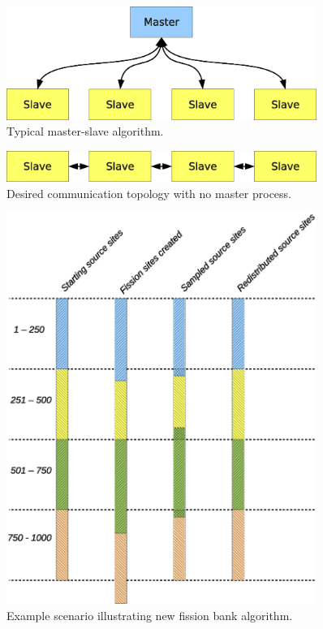 \documentclass[11pt]{article}
\begin{document}
\clearpage
\begin{figure}[p]
  \centering
  \includegraphics[width=0.9\textwidth]{master-slave.eps}
  \caption{Typical master-slave algorithm.}
  \label{fig:master-slave}
\end{figure}

\clearpage
\begin{figure}[p]
  \centering
  \includegraphics[width=0.9\textwidth]{slave-only.eps}
  \caption{Desired communication topology with no master process.}
  \label{fig:slave-only}
\end{figure}

\clearpage
\begin{figure}[p]
  \centering
  \includegraphics[width=0.9\textwidth]{algorithm-new.eps}
  \caption{Example scenario illustrating new fission bank algorithm.}
  \label{fig:algorithm-new}
\end{figure}
\end{document}
